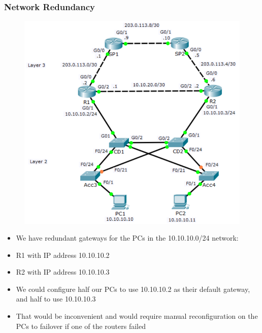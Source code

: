 \documentclass[pdflatex,compress,mathserif]{beamer}
\begin{document}
\begin{frame}
	\frametitle{Network Redundancy}
	\begin{multicols}{2}
		\begin{figure}
			\centering
			\includegraphics[width=\linewidth]{img/img09}
		\end{figure}
		\begin{itemize}
			\item We have redundant gateways for the PCs
in the 10.10.10.0/24 network:
		\end{itemize}
		\columnbreak
		\begin{itemize}
			\item R1 with IP address 10.10.10.2
			\item R2 with IP address 10.10.10.3
			\item We could configure half our PCs to use
10.10.10.2 as their default gateway, and
half to use 10.10.10.3
			\item That would be inconvenient and would
require manual reconfiguration on the
PCs to failover if one of the routers failed
		\end{itemize}
	\end{multicols}
\end{frame}
\end{document}
